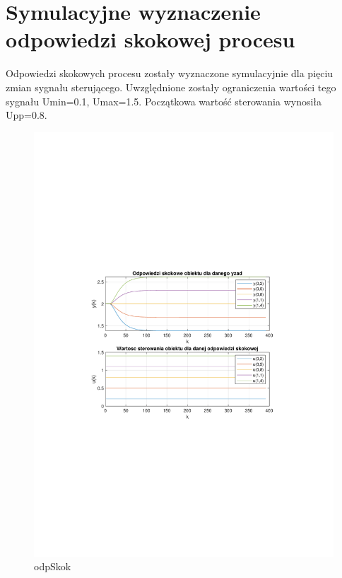 \section{Symulacyjne wyznaczenie odpowiedzi skokowej procesu}

Odpowiedzi skokowych procesu zostały wyznaczone symulacyjnie dla pięciu zmian sygnału sterującego. 
Uwzględnione zostały ograniczenia wartości tego sygnału Umin=\num{0.1}, Umax=\num{1.5}. 
Początkowa wartość sterowania wynosiła Upp=\num{0.8}.

\begin{figure}[H]
    \centering
    \includegraphics[scale=0.8]{../projekt/zad2/Dane/odp_skok.pdf}
    \caption{ odpSkok }
\end{figure}

